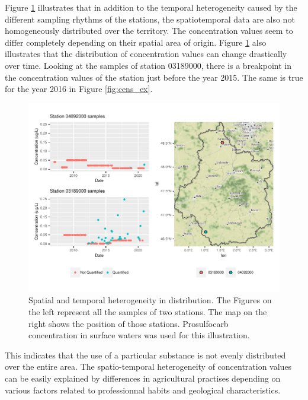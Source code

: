 Figure \ref{fig:het_spa_ex} illustrates that in addition to the temporal heterogeneity caused by the different sampling rhythms of the stations, the spatiotemporal data are also not homogeneously distributed over the territory. The concentration values seem to differ completely depending on their spatial area of origin. Figure \ref{fig:het_spa_ex} also illustrates that the distribution of concentration values can change drastically over time. Looking at the samples of station 03189000, there is a breakpoint in the concentration values of the station just before the year 2015. The same is true for the year 2016 in Figure \ref{fig:cens_ex}. 
\begin{figure}[htbp]
    \centering
    \includegraphics{figs/Chap3/Het_resC.pdf}
    \caption{Spatial and temporal heterogeneity in distribution. The Figures on the left represent all the samples of two stations. The map on the right shows the position of those stations. Prosulfocarb concentration in surface waters was used for this illustration.}
    \label{fig:het_spa_ex}
\end{figure}
This indicates that the use of a particular substance is not evenly distributed over the entire area. The spatio-temporal heterogeneity of concentration values can be easily explained by differences in agricultural practises depending on various factors related to professionnal habits and geological characteristics.


